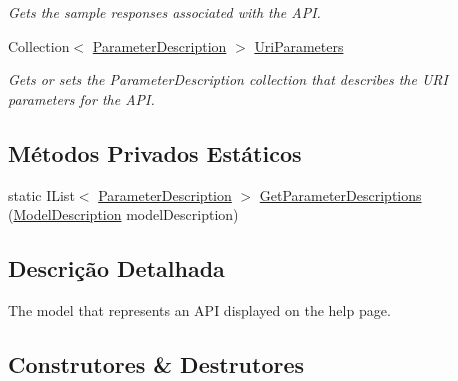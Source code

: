\begin{DoxyCompactItemize}
\begin{DoxyCompactList}\small\item\em Gets the sample responses associated with the A\+PI. \end{DoxyCompactList}\item 
Collection$<$ \hyperlink{classApi3Layers_1_1Areas_1_1HelpPage_1_1ModelDescriptions_1_1ParameterDescription}{Parameter\+Description} $>$ \hyperlink{classApi3Layers_1_1Areas_1_1HelpPage_1_1Models_1_1HelpPageApiModel_a2f4ee03fa855608076ab48dc71fb61f5}{Uri\+Parameters}
\begin{DoxyCompactList}\small\item\em Gets or sets the Parameter\+Description collection that describes the U\+RI parameters for the A\+PI. \end{DoxyCompactList}\end{DoxyCompactItemize}
\subsection*{Métodos Privados Estáticos}
\begin{DoxyCompactItemize}
\item 
static I\+List$<$ \hyperlink{classApi3Layers_1_1Areas_1_1HelpPage_1_1ModelDescriptions_1_1ParameterDescription}{Parameter\+Description} $>$ \hyperlink{classApi3Layers_1_1Areas_1_1HelpPage_1_1Models_1_1HelpPageApiModel_a46f28b264ed67e8b868762020f049126}{Get\+Parameter\+Descriptions} (\hyperlink{classApi3Layers_1_1Areas_1_1HelpPage_1_1ModelDescriptions_1_1ModelDescription}{Model\+Description} model\+Description)
\end{DoxyCompactItemize}


\subsection{Descrição Detalhada}
The model that represents an A\+PI displayed on the help page. 



\subsection{Construtores \& Destrutores}
\mbox{\label{classApi3Layers_1_1Areas_1_1HelpPage_1_1Models_1_1HelpPageApiModel_a0743b6d8422d1b857b2bfccee21d846c}} 
